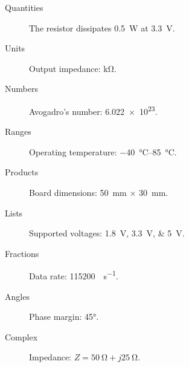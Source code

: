 \begin{description}
    \item[Quantities] The resistor dissipates \qty{0.5}{\watt} at \qty{3.3}{\volt}.
    \item[Units]       Output impedance: \unit{\kilo\ohm}.
    \item[Numbers]     Avogadro's number: \num{6.022e23}.
    \item[Ranges]      Operating temperature: \qtyrange{-40}{85}{\degreeCelsius}.
    \item[Products]    Board dimensions: \qty{50}{\milli\meter} $\times$ \qty{30}{\milli\meter}.
    \item[Lists]       Supported voltages: \qtylist{1.8;3.3;5}{\volt}.
    \item[Fractions]   Data rate: \qty{115200}{\bit\per\second}.
    \item[Angles]      Phase margin: \ang{45}.
    \item[Complex]     Impedance: $Z = \qty{50}{\ohm} + j\qty{25}{\ohm}$.
\end{description}
